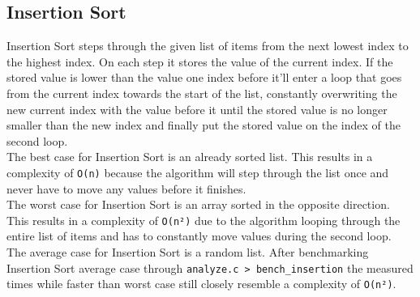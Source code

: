 \documentclass{article}
\begin{document}
    \subsection{Insertion Sort}
    Insertion Sort steps through the given list of items from the next lowest index to the highest index. On each step it stores the value of the current index.
    If the stored value is lower than the value one index before it'll enter a loop that goes from the current index towards the start of the list,
    constantly overwriting the new current index with the value before it until the stored value is no longer smaller than the new index and finally put the stored value on the index of the second loop.\\
    The best case for Insertion Sort is an already sorted list. This results in a complexity of \texttt{O(n)} because the algorithm will step through the list once and never have to move any values before it finishes.\\
    The worst case for Insertion Sort is an array sorted in the opposite direction. This results in a complexity of \texttt{O(n²)} due to the algorithm looping through the entire list of items and has to constantly move values during the second loop.\\
    The average case for Insertion Sort is a random list. After benchmarking Insertion Sort average case through \texttt{analyze.c > bench\_insertion} the measured times while faster than worst case still closely resemble a complexity of \texttt{O(n²)}.
\end{document}
